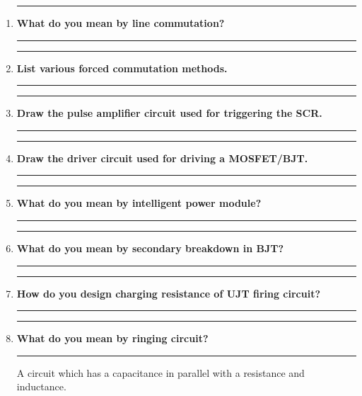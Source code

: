 \documentclass[12pt]{article}
\newcommand\question[1]{\item\vspace{.25in}\hrule\textbf{#1}\vspace{.5em}\hrule\vspace{.10in}}
\begin{document}
\begin{enumerate}
    \question{What do you mean by line commutation?}
    
    \question{List various forced commutation methods.}
    
    \question{Draw the pulse amplifier circuit used for triggering the SCR.}
    
    \question{Draw the driver circuit used for driving a MOSFET/BJT.}
    
    \question{What do you mean by intelligent power module?}
    
    \question{What do you mean by secondary breakdown in BJT?}
    
    \question{How do you design charging resistance of UJT firing circuit?}
    
    \question{What do you mean by ringing circuit?}
    
    A circuit which has a capacitance in parallel with a resistance and inductance.

\end{enumerate}
\end{document}
